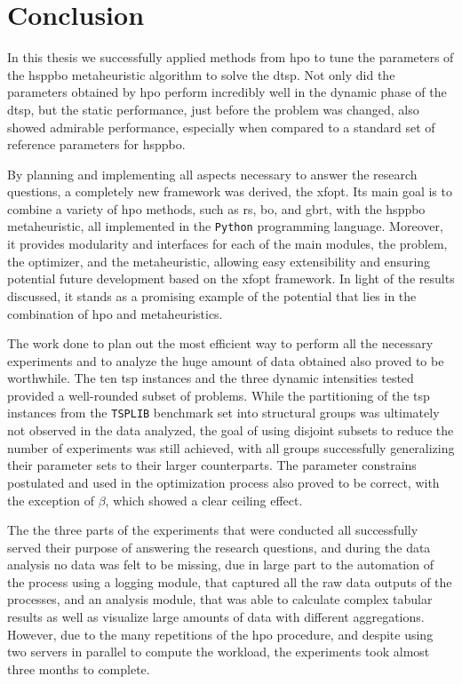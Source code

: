 

\chapter{Conclusion}
\label{chap:conclusion}

\glsresetall

In this thesis we successfully applied methods from \gls{hpo} to tune the parameters of the \gls{hsppbo} metaheuristic algorithm to solve the \gls{dtsp}. 
Not only did the parameters obtained by \gls{hpo} perform incredibly well in the dynamic phase of the \gls{dtsp}, but the static performance, just before the problem was changed, also showed admirable performance, especially when compared to a standard set of reference parameters for \gls{hsppbo}.

By planning and implementing all aspects necessary to answer the research questions, a completely new framework was derived, the \gls{xfopt}. Its main goal is to combine a variety of \gls{hpo} methods, such as \gls{rs}, \gls{bo}, and \gls{gbrt}, with the \gls{hsppbo} metaheuristic, all implemented in the \texttt{Python} programming language. Moreover, it provides modularity and interfaces for each of the main modules, the problem, the optimizer, and the metaheuristic, allowing easy extensibility and ensuring potential future development based on the \gls{xfopt} framework. 
In light of the results discussed, it stands as a promising example of the potential that lies in the combination of \gls{hpo} and metaheuristics.

The work done to plan out the most efficient way to perform all the necessary experiments and to analyze the huge amount of data obtained also proved to be worthwhile. The ten \gls{tsp} instances and the three dynamic intensities tested provided a well-rounded subset of problems. While the partitioning of the \gls{tsp} instances from the  \texttt{TSPLIB} benchmark set into structural groups was ultimately not observed in the data analyzed, the goal of using disjoint subsets to reduce the number of experiments was still achieved, with all groups successfully generalizing their parameter sets to their larger counterparts. The parameter constrains postulated and used in the optimization process also proved to be correct, with the exception of $\beta$, which showed a clear ceiling effect. 

The the three parts of the experiments that were conducted all successfully served their purpose of answering the research questions, and during the data analysis no data was felt to be missing, due in large part to the automation of the process using a logging module, that captured all the raw data outputs of the processes, and an analysis module, that was able to calculate complex tabular results as well as visualize large amounts of data with different aggregations. However, due to the many repetitions of the \gls{hpo} procedure, and despite using two servers in parallel to compute the workload, the experiments took almost three months to complete.

